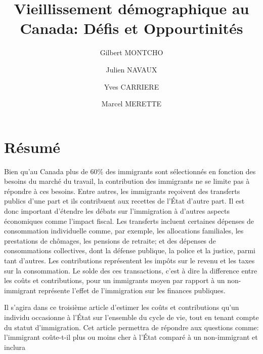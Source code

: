 



\title{Vieillissement démographique au Canada: Défis et Oppourtinités}
\author[1]{Gilbert MONTCHO}
\author[3]{Julien NAVAUX}
\author[1]{Yves CARRIERE}
\author[2]{Marcel MERETTE}



\date{}

\maketitle

\section*{Résumé}



Bien qu'au Canada plus de 60\% des immigrants sont sélectionnés en fonction des besoins du marché du travail, la contribution des immigrants ne se limite pas à répondre à ces besoins. Entre autres, les immigrants reçoivent des transferts publics d'une part et ils contribuent aux recettes de l’État  d’autre part. Il est donc important d'étendre les débats sur l'immigration à d'autres aspects économiques comme l'impact fiscal. Les transferts incluent certaines dépenses de consommation individuelle comme, par exemple, les allocations familiales, les prestations de chômages, les pensions de retraite; et des dépenses de consommations collectives, dont la défense publique, la police et la justice, parmi tant d’autres. Les contributions représentent les impôts sur le revenu et les taxes sur la consommation. Le solde des ces transactions, c'est à dire la difference entre les coûts et contributions, pour un immigrants moyen par rapport à un non-immigrant représente l'effet de l'immigration sur les finances publiques.


Il s'agira dans ce troisième article d'estimer les coûts et contributions qu'un individu occasionne à l’État sur l'ensemble du cycle de vie, tout en tenant compte du statut d'immigration. Cet article permettra de répondre aux questions comme: l'immigrant coûte-t-il plus ou moins cher à l'État comparé à un non-immigrant et inclura

